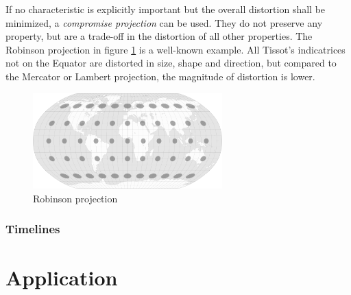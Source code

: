If no characteristic is explicitly important but the overall distortion shall be minimized, a \emph{compromise projection} can be used. They do not preserve any property, but are a trade-off in the distortion of all other properties. The Robinson projection in figure \ref{fig:robinson_projection} is a well-known example. All Tissot's indicatrices not on the Equator are distorted in size, shape and direction, but compared to the Mercator or Lambert projection, the magnitude of distortion is lower.

\begin{figure}[ht]
  \centering
  \includegraphics[width=0.65\textwidth]{graphics/basics/projection_distortion_robinson.png}
  \caption{Robinson projection \protect\footnotemark}
  \label{fig:robinson_projection}
\end{figure}




\subsubsection{Timelines} %
\label{ssub:timelines}




\section{Application} %
\label{sec:application}


